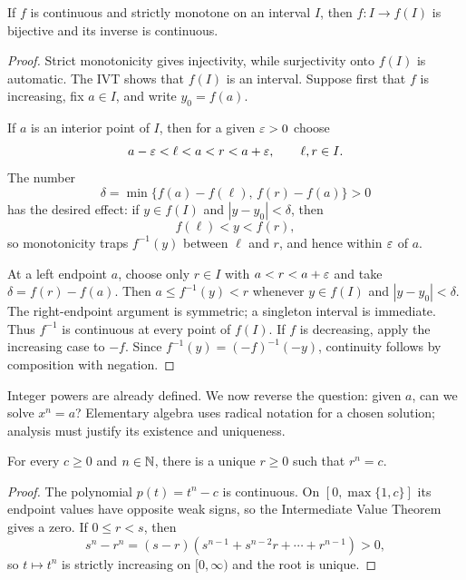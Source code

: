 \begin{theorem}
\label{thm:monotone-inverse-continuity}
If $f$ is continuous and strictly monotone on an interval $I$, then
$f:I\to f(I)$ is bijective and its inverse is continuous.
\end{theorem}
\begin{proof}
Strict monotonicity gives injectivity, while surjectivity onto $f(I)$ is
automatic. The IVT shows that $f(I)$ is an interval. Suppose first that
$f$ is increasing, fix $a\in I$, and write $y_0=f(a)$.

If $a$ is an interior point of $I$, then for a given $\varepsilon>0$ choose
\[
a-\varepsilon<\ell<a<r<a+\varepsilon,
\qquad \ell,r\in I.
\]
The number
\[
\delta=\min\{f(a)-f(\ell),\,f(r)-f(a)\}>0
\]
has the desired effect: if $y\in f(I)$ and $|y-y_0|<\delta$, then
\[
f(\ell)<y<f(r),
\]
so monotonicity traps $f^{-1}(y)$ between $\ell$ and $r$, and hence within
$\varepsilon$ of $a$.

At a left endpoint $a$, choose only $r\in I$ with
$a<r<a+\varepsilon$ and take $\delta=f(r)-f(a)$.  Then
$a\leq f^{-1}(y)<r$ whenever $y\in f(I)$ and $|y-y_0|<\delta$.
The right-endpoint argument is symmetric; a singleton interval is
immediate. Thus $f^{-1}$ is continuous at every point of $f(I)$. If $f$
is decreasing, apply the increasing case to $-f$. Since
$f^{-1}(y)=(-f)^{-1}(-y)$, continuity follows by composition with negation.
\end{proof}

Integer powers are already defined. We now reverse the question: given
$a$, can we solve $x^n=a$? Elementary algebra uses radical notation for a
chosen solution; analysis must justify its existence and uniqueness.

\begin{theorem}
\label{thm:real-roots}
For every $c\geq0$ and $n\in\mathbb{N}$, there is a unique $r\geq0$ such that
$r^n=c$.
\end{theorem}
\begin{proof}
The polynomial $p(t)=t^n-c$ is continuous.  On
$[0,\max\{1,c\}]$ its endpoint values have opposite weak signs, so the
Intermediate Value Theorem gives a zero.  If $0\leq r<s$, then
\[
s^n-r^n=(s-r)(s^{n-1}+s^{n-2}r+\cdots+r^{n-1})>0,
\]
so $t\mapsto t^n$ is strictly increasing on $[0,\infty)$ and the root is
unique.
\end{proof}

